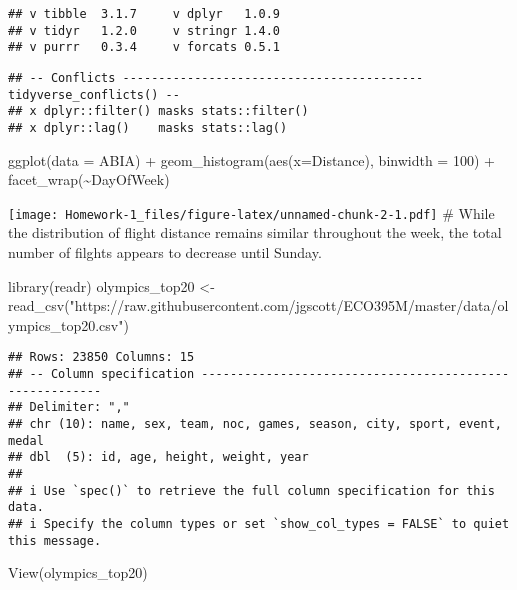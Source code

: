 \documentclass[
]{article}
\newenvironment{Shaded}{\begin{snugshade}}{\end{snugshade}}
\newcommand{\AttributeTok}[1]{\textcolor[rgb]{0.77,0.63,0.00}{#1}}
\newcommand{\DecValTok}[1]{\textcolor[rgb]{0.00,0.00,0.81}{#1}}
\newcommand{\FunctionTok}[1]{\textcolor[rgb]{0.00,0.00,0.00}{#1}}
\newcommand{\NormalTok}[1]{#1}
\newcommand{\OtherTok}[1]{\textcolor[rgb]{0.56,0.35,0.01}{#1}}
\newcommand{\SpecialCharTok}[1]{\textcolor[rgb]{0.00,0.00,0.00}{#1}}
\newcommand{\StringTok}[1]{\textcolor[rgb]{0.31,0.60,0.02}{#1}}
\begin{document}
\begin{verbatim}
## v tibble  3.1.7     v dplyr   1.0.9
## v tidyr   1.2.0     v stringr 1.4.0
## v purrr   0.3.4     v forcats 0.5.1
\end{verbatim}

\begin{verbatim}
## -- Conflicts ------------------------------------------ tidyverse_conflicts() --
## x dplyr::filter() masks stats::filter()
## x dplyr::lag()    masks stats::lag()
\end{verbatim}

\begin{Shaded}
\begin{Highlighting}[]
\FunctionTok{ggplot}\NormalTok{(}\AttributeTok{data =}\NormalTok{ ABIA) }\SpecialCharTok{+} \FunctionTok{geom\_histogram}\NormalTok{(}\FunctionTok{aes}\NormalTok{(}\AttributeTok{x=}\NormalTok{Distance), }\AttributeTok{binwidth =} \DecValTok{100}\NormalTok{) }\SpecialCharTok{+} \FunctionTok{facet\_wrap}\NormalTok{(}\SpecialCharTok{\textasciitilde{}}\NormalTok{DayOfWeek)}
\end{Highlighting}
\end{Shaded}

\texttt{[image: Homework-1\_files/figure-latex/unnamed-chunk-2-1.pdf]} \#
While the distribution of flight distance remains similar throughout the
week, the total number of filghts appears to decrease until Sunday.

\begin{Shaded}
\begin{Highlighting}[]
\FunctionTok{library}\NormalTok{(readr)}
\NormalTok{olympics\_top20 }\OtherTok{\textless{}{-}} \FunctionTok{read\_csv}\NormalTok{(}\StringTok{"https://raw.githubusercontent.com/jgscott/ECO395M/master/data/olympics\_top20.csv"}\NormalTok{)}
\end{Highlighting}
\end{Shaded}

\begin{verbatim}
## Rows: 23850 Columns: 15
## -- Column specification --------------------------------------------------------
## Delimiter: ","
## chr (10): name, sex, team, noc, games, season, city, sport, event, medal
## dbl  (5): id, age, height, weight, year
## 
## i Use `spec()` to retrieve the full column specification for this data.
## i Specify the column types or set `show_col_types = FALSE` to quiet this message.
\end{verbatim}

\begin{Shaded}
\begin{Highlighting}[]
\FunctionTok{View}\NormalTok{(olympics\_top20)}
\end{Highlighting}
\end{Shaded}
\end{document}
